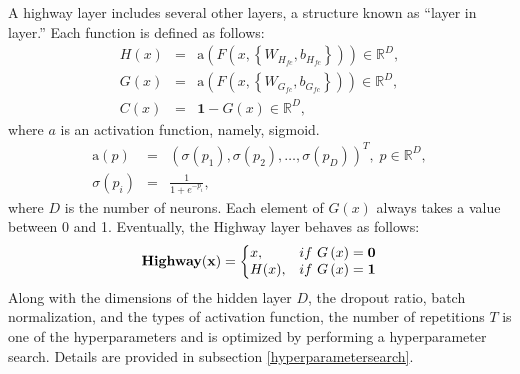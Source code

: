\documentclass[proof]{pasj01}
\begin{document}
A highway layer includes several other layers, a structure known as ``layer in layer.'' Each function is defined as follows: 
\begin{eqnarray}
    H \left(x\right) &=& \mathrm{a} \left( F \left(x, \left\{W_{H_{fc}}, b_{H_{fc}}\right\}\right) \right) \in \mathbb{R}^D, \\
    G \left(x\right) &=& \mathrm{a} \left( F \left(x, \left\{W_{G_{fc}}, b_{G_{fc}}\right\}\right) \right) \in \mathbb{R}^D, \\
    C \left(x\right) &=& \mathbf{1} - G \left(x\right) \in \mathbb{R}^D,
\end{eqnarray}
where $a$ is an activation function, namely, sigmoid.
\begin{eqnarray*}
    \mathrm{a} \left(p\right) &=& \left( \sigma\left(p_1\right),\sigma\left(p_2\right), \ldots, \sigma\left(p_D\right) \right)^T, \; p \in \mathbb{R}^D, \\
    \sigma \left(p_i\right) &=& \frac{1}{1 + e^{-p_i}},
\end{eqnarray*}
where $D$ is the number of neurons. Each element of $G(x)$ always takes a value between 0 and 1. Eventually, the Highway layer behaves as follows:
\begin{equation}
    {\bf Highway(x)}=\left\{
    \begin{array}{@{}ll@{}}
      x, & \mathrm{if} \ G \left(x\right)= \mathbf{0} \\
      H(x), & \mathrm{if} \ G \left(x\right)= \mathbf{1} 
    \end{array}\right.
\end{equation}
Along with the dimensions of the hidden layer $D$, the dropout ratio, batch normalization, and the types of activation function, the number of repetitions $T$ is one of the hyperparameters and is optimized by performing a hyperparameter search. Details are provided in subsection \ref{hyperparametersearch}.
\end{document}

